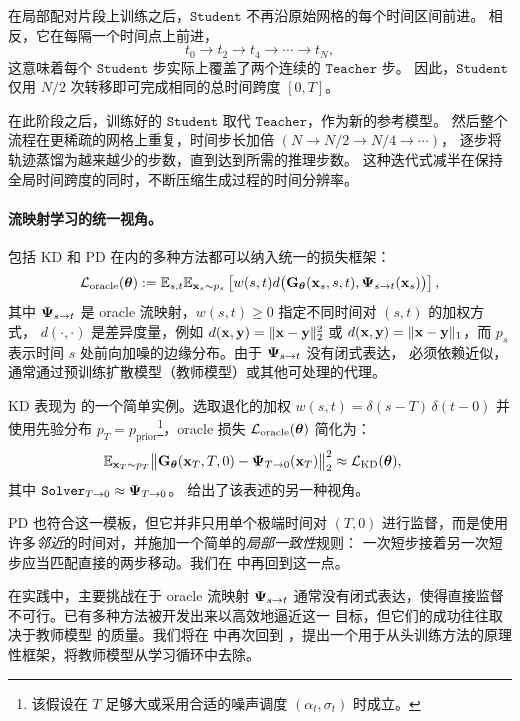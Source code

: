 在局部配对片段上训练之后，$ \mathtt{Student} $ 不再沿原始网格的每个时间区间前进。
相反，它在每隔一个时间点上前进，
\[
t_0 \to t_2 \to t_4 \to \cdots \to t_N,
\]
这意味着每个 $ \mathtt{Student} $ 步实际上覆盖了两个连续的 $ \mathtt{Teacher}$ 步。
因此，$ \mathtt{Student} $ 仅用 $N/2$ 次转移即可完成相同的总时间跨度 $[0,T]$。

在此阶段之后，训练好的 $ \mathtt{Student} $ 取代 $ \mathtt{Teacher}$，作为新的参考模型。
然后整个流程在更稀疏的网格上重复，时间步长加倍
$(N \to N/2 \to N/4 \to \cdots)$，
逐步将轨迹蒸馏为越来越少的步数，直到达到所需的推理步数。
这种迭代式减半在保持全局时间跨度的同时，不断压缩生成过程的时间分辨率。






\paragraph{流映射学习的统一视角。}
包括 KD 和 PD 在内的多种方法都可以纳入统一的损失框架：
\begin{align}\label{eq:general-cm-loss}
  \mathcal{L}_{\mathrm{oracle}}({\bm{\theta}})
  := \mathbb{E}_{s,t} \mathbb{E}_{{\mathbf{x}}_s \sim p_s} 
  \left[  w(s,t)  d \big({\mathbf{G}}_{\bm{\theta}}({\mathbf{x}}_s, s,t),  {\bm{\Psi}}_{s\to t}({\mathbf{x}}_s)\big)\right],
\end{align}
其中 ${\bm{\Psi}}_{s\to t}$ 是 oracle 流映射，$w(s,t) \geq 0$ 指定不同时间对 $(s,t)$ 的加权方式，
$d(\cdot,\cdot)$ 是差异度量，例如
$d({\mathbf{x}},{\mathbf{y}})=\|{\mathbf{x}}-{\mathbf{y}}\|_2^2$ 或 $d({\mathbf{x}},{\mathbf{y}})=\|{\mathbf{x}}-{\mathbf{y}}\|_1$，而 $p_s$ 表示时间 $s$ 处前向加噪的边缘分布。由于 ${\bm{\Psi}}_{s\to t}$ 没有闭式表达，
必须依赖近似，通常通过预训练扩散模型（教师模型）或其他可处理的代理。

KD 表现为
 的一个简单实例。选取退化的加权
$w(s,t)=\delta(s{-}T)\,\delta(t{-}0)$ 并使用先验分布
$p_T=p_{\mathrm{prior}}$\footnote{该假设在 $T$ 足够大或采用合适的噪声调度 $(\alpha_t,\sigma_t)$ 时成立。}，oracle 损失 $\mathcal{L}_{\mathrm{oracle}}({\bm{\theta}})$ 简化为：
\[
\mathbb{E}_{{\mathbf{x}}_T\sim p_T}
\big\|{\mathbf{G}}_{\bm{\theta}}({\mathbf{x}}_T,T,0)-{\bm{\Psi}}_{T\to 0}({\mathbf{x}}_T)\big\|_2^2
\approx \mathcal{L}_{\mathrm{KD}}({\bm{\theta}}),
\quad
\]
其中 $\mathtt{Solver}_{T\to 0}\approx{\bm{\Psi}}_{T\to 0}$。 给出了该表述的另一种视角。


PD 也符合这一模板，但它并非只用单个极端时间对 $(T,0)$ 进行监督，而是使用许多\emph{邻近}的时间对，并施加一个简单的\emph{局部一致性}规则：
一次短步接着另一次短步应当匹配直接的两步移动。我们在  中再回到这一点。

在实践中，主要挑战在于 oracle 流映射 ${\bm{\Psi}}_{s\to t}$ 通常没有闭式表达，使得直接监督不可行。已有多种方法被开发出来以高效地逼近这一
目标，但它们的成功往往取决于教师模型
的质量。我们将在  中再次回到 ，提出一个用于从头训练方法的原理性框架，将教师模型从学习循环中去除。









